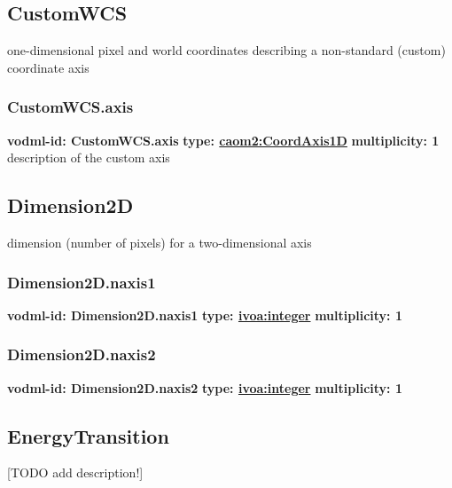   \subsection{CustomWCS}
  \label{sect:CustomWCS}
    one-dimensional pixel and world coordinates describing a non-standard (custom) coordinate axis

    \subsubsection{CustomWCS.axis}
      \textbf{vodml-id: CustomWCS.axis} \newline
      \textbf{type: \hyperref[sect:CoordAxis1D]{caom2:CoordAxis1D}} \newline
      \textbf{multiplicity: 1} \newline
      description of the custom axis

  \subsection{Dimension2D}
  \label{sect:Dimension2D}
    dimension (number of pixels) for a two-dimensional axis

    \subsubsection{Dimension2D.naxis1}
      \textbf{vodml-id: Dimension2D.naxis1} \newline
      \textbf{type: \hyperref[sect:ivoa]{ivoa:integer}} \newline
      \textbf{multiplicity: 1} 

    \subsubsection{Dimension2D.naxis2}
      \textbf{vodml-id: Dimension2D.naxis2} \newline
      \textbf{type: \hyperref[sect:ivoa]{ivoa:integer}} \newline
      \textbf{multiplicity: 1} 

  \subsection{EnergyTransition}
  \label{sect:EnergyTransition}
    [TODO add description!]

